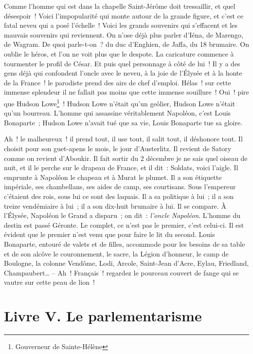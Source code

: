 \documentclass[french,twoside]{book} %
\newcommand\chapteropen{} %
\newcommand\chapterclose{} %
\begin{document}
Comme l’homme qui est dans la chapelle Saint-Jérôme doit tressaillir, et quel désespoir ! Voici l’impopularité qui monte autour de la grande figure, et c’est ce fatal neveu qui a posé l’échelle ! Voici les grands souvenirs qui s’effacent et les mauvais souvenirs qui reviennent. On n’ose déjà plus parler d’Iéna, de Marengo, de Wagram. De quoi parle-t-on ? du duc d’Enghien, de Jaffa, du 18 brumaire. On oublie le héros, et l’on ne voit plus que le despote. La caricature commence à tourmenter le profil de César. Et puis quel personnage à côté de lui ! Il y a des gens déjà qui confondent l’oncle avec le neveu, à la joie de l’Élysée et à la honte de la France ! le parodiste prend des airs de chef d’emploi. Hélas ! sur cette immense splendeur il ne fallait pas moins que cette immense souillure ! Oui ! pire que Hudson Lowe\footnote{Gouverneur de Sainte-Hélène} ! Hudson Lowe n’était qu’un geôlier, Hudson Lowe n’était qu’un bourreau. L’homme qui assassine véritablement Napoléon, c’est Louis Bonaparte ; Hudson Lowe n’avait tué que sa vie, Louis Bonaparte tue sa gloire.\par
Ah ! le malheureux ! il prend tout, il use tout, il salit tout, il déshonore tout. Il choisit pour son guet-apens le mois, le jour d’Austerlitz. Il revient de Satory comme on revient d’Aboukir. Il fait sortir du 2 décembre je ne sais quel oiseau de nuit, et il le perche sur le drapeau de France, et il dit : Soldats, voici l’aigle. Il emprunte à Napoléon le chapeau et à Murat le plumet. Il a son étiquette impériale, ses chambellans, ses aides de camp, ses courtisans. Sous l’empereur c’étaient des rois, sous lui ce sont des laquais. Il a sa politique à lui ; il a son treize vendémiaire à lui ; il a son dix-huit brumaire à lui. Il se compare. À l’Élysée, Napoléon le Grand a disparu ; on dit : \emph{l’oncle Napoléon}. L’homme du destin est passé Géronte. Le complet, ce n’est pas le premier, c’est celui-ci. Il est évident que le premier n’est venu que pour faire le lit du second. Louis Bonaparte, entouré de valets et de filles, accommode pour les besoins de sa table et de son alcôve le couronnement, le sacre, la Légion d’honneur, le camp de Boulogne, la colonne Vendôme, Lodi, Arcole, Saint-Jean d’Acre, Eylau, Friedland, Champaubert… – Ah ! Français ! regardez le pourceau couvert de fange qui se vautre sur cette peau de lion !
\chapterclose


\chapteropen

\chapter[{Livre V. Le parlementarisme}]{Livre V. Le parlementarisme}
\renewcommand{\leftmark}{Livre V. Le parlementarisme}
\end{document}

